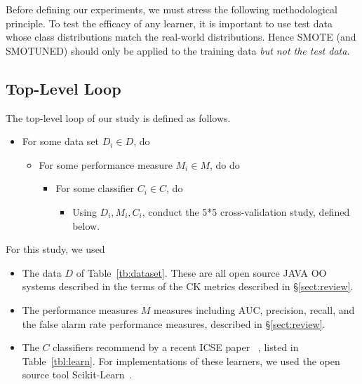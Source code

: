 \documentclass[10pt,conference]{IEEEtran}
\newcommand{\bi}{\begin{itemize}[leftmargin=0.4cm]}
\newcommand{\ei}{\end{itemize}}
\theoremstyle{break}
\theoremstyle{break}
\newcommand{\tion}[1]{{\S}\ref{sect:#1}}
\begin{document}
Before defining our experiments, 
we must  stress the following methodological
principle.
To test the efficacy of any learner, it is important to
use test data whose class distributions match the real-world distributions.
Hence SMOTE (and SMOTUNED) should only
be applied to the training data {\em but
not the test data}.

\subsection{Top-Level Loop}

The top-level loop of 
our study is defined as follows.
\bi
\item For some data set $D_i \in D$, do
\bi
\item  For some performance measure $M_i \in M$, do do
\bi
\item  For some classifier $C_i \in C$, do
\bi
\item
Using $D_i,M_i,C_i$, conduct the 5*5 cross-validation study, defined below.
\ei
\ei
\ei
\ei
For this study, we used
\bi
\item
The data $D$ of Table~\ref{tb:dataset}. These are all open source
JAVA OO systems described in the terms of the CK metrics described in \tion{review}.
\item
The performance measures $M$ measures including  AUC, precision, recall, and the  false alarm rate performance
measures, described in \tion{review}.
\item
The  
 $C$ classifiers recommend by a recent ICSE paper~\cite{ghotra2015revisiting}
, listed
in Table~\ref{tbl:learn}.
For  implementations 
of these learners,
we used  the open source tool
Scikit-Learn~\cite{pedregosa2011scikit}.
\ei
\end{document}
